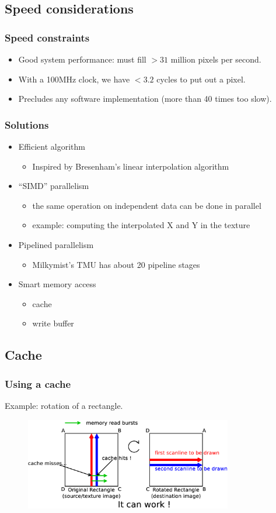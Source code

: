 \documentclass{beamer}
\begin{document}
\subsection{Speed considerations}
\frame
{
  \frametitle{Speed constraints}

  \begin{itemize}
  \item Good system performance: must fill $> 31$ million pixels per second.
  \item With a 100MHz clock, we have $< 3.2$ cycles to put out a pixel.
  \item Precludes any software implementation (more than 40 times too slow).
  \end{itemize}
}

\frame
{
  \frametitle{Solutions}

  \begin{itemize}
  \item Efficient algorithm
  \begin{itemize}
  \item Inspired by Bresenham's linear interpolation algorithm
  \end{itemize}
  \item ``SIMD'' parallelism
  \begin{itemize}
  \item the same operation on independent data can be done in parallel
  \item example: computing the interpolated X and Y in the texture
  \end{itemize}
  \item Pipelined parallelism
  \begin{itemize}
  \item Milkymist's TMU has about 20 pipeline stages
  \end{itemize}
  \item Smart memory access
  \begin{itemize}
  \item cache
  \item write buffer
  \end{itemize}
  \end{itemize}
}

\subsection{Cache}
\frame
{
  \frametitle{Using a cache}

  Example: rotation of a rectangle.
  \begin{figure}[H]
  \includegraphics[height=40mm]{fillmempattern.eps}
  \end{figure}
}
\end{document}
